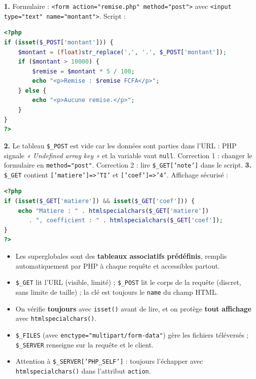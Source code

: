 \documentclass[11pt]{article}
\begin{document}
\begin{corrige}[Exercice]
\textbf{1.} Formulaire : \texttt{<form action="remise.php" method="post">} avec \texttt{<input type="text" name="montant">}. Script :
\begin{lstlisting}[language=Php]
<?php
if (isset($_POST['montant'])) {
    $montant = (float)str_replace(',', '.', $_POST['montant']);
    if ($montant > 10000) {
        $remise = $montant * 5 / 100;
        echo "<p>Remise : $remise FCFA</p>";
    } else {
        echo "<p>Aucune remise.</p>";
    }
}
?>
\end{lstlisting}
\textbf{2.} Le tableau \texttt{\$\_POST} est vide car les données sont parties dans l'URL : PHP signale \emph{« Undefined array key »} et la variable vaut \texttt{null}. Correction 1 : changer le formulaire en \texttt{method="post"}. Correction 2 : lire \texttt{\$\_GET['note']} dans le script. \textbf{3.} \texttt{\$\_GET} contient \texttt{['matiere']=>'TI'} et \texttt{['coef']=>'4'}. Affichage sécurisé :
\begin{lstlisting}[language=Php]
<?php
if (isset($_GET['matiere']) && isset($_GET['coef'])) {
    echo "Matiere : " . htmlspecialchars($_GET['matiere'])
       . ", coefficient : " . htmlspecialchars($_GET['coef']);
}
?>
\end{lstlisting}
\end{corrige}

\begin{aretenir}
\begin{itemize}
\item Les superglobales sont des \textbf{tableaux associatifs prédéfinis}, remplis automatiquement par PHP à chaque requête et accessibles partout.
\item \texttt{\$\_GET} lit l'URL (visible, limité) ; \texttt{\$\_POST} lit le corps de la requête (discret, sans limite de taille) ; la clé est toujours le \texttt{name} du champ HTML.
\item On vérifie \textbf{toujours} avec \texttt{isset()} avant de lire, et on protège \textbf{tout affichage} avec \texttt{htmlspecialchars()}.
\item \texttt{\$\_FILES} (avec \texttt{enctype="multipart/form-data"}) gère les fichiers téléversés ; \texttt{\$\_SERVER} renseigne sur la requête et le client.
\item Attention à \texttt{\$\_SERVER['PHP\_SELF']} : toujours l'échapper avec \texttt{htmlspecialchars()} dans l'attribut \texttt{action}.
\end{itemize}
\end{aretenir}
\end{document}
